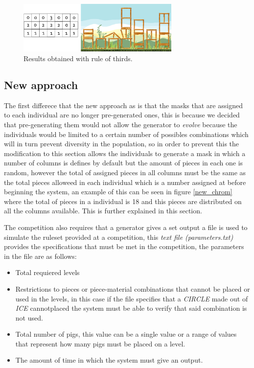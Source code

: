 \documentclass[conference]{IEEEtran}
\begin{document}
\begin{figure}[htbp]
    \centerline{\includegraphics[width=80mm]{Images/result_example_thirds.png}}
    \caption{Results obtained with rule of thirds.}
    \label{rule_of_thirds_result}
\end{figure}

\subsection{New approach}

The first differece that the new approach as is that the masks that are assigned to each individual are no longer pre-generated ones, this is because we decided that pre-generating them would not allow the generator to \textit{evolve} because the individuals would be limited to a certain number of possibles combinations which will in turn prevent diversity in the population, so in order to prevent this the modification to this section allows the individuals to generate a mask in which a number of columns is defines by default but the amount of pieces in each one is random, however the total of assigned pieces in all columns must be the same as the total pieces alloweed in each individual which is a number assigned at before beginning the system, an example of this can be seen in figure \ref{new_chrom} where the total of pieces in a individual is 18 and this pieces are distributed on all the columns available. This is further explained in this section.

The competition also requires that a generator gives a set output a file is used to simulate the ruleset provided at a competition, this \textit{text file (parameters.txt)} provides the specifications that must be met in the competition, the parameters in the file are as follows:

\begin{itemize}
    \item Total requiered levels
    \item Restrictions to pieces or piece-material combinations that cannot be placed or used in the levels, in this case if the file specifies that a \textit{CIRCLE} made out of \textit{ICE} cannotplaced the system must be able to verify that said combination is not used.
    \item Total number of pigs, this value can be a single value or a range of values that represent how many pigs must be placed on a level.
    \item The amount of time in which the system must give an output.
\end{itemize}
\end{document}
